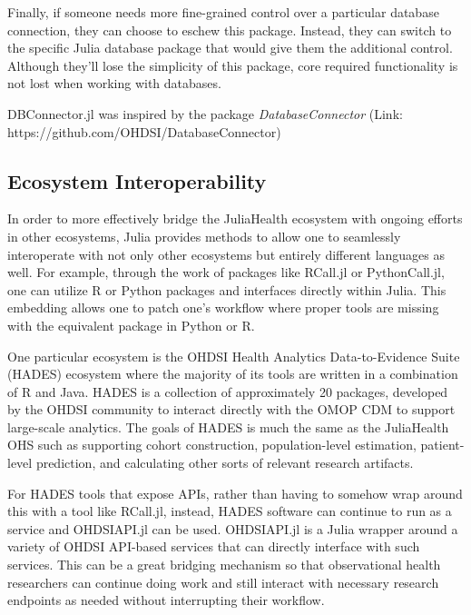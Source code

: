 \documentclass{juliacon}
\begin{document}
Finally, if someone needs more fine-grained control over a particular database connection, they can choose to eschew this package.
Instead, they can switch to the specific Julia database package that would give them the additional control.
Although they'll lose the simplicity of this package, core required functionality is not lost when working with databases.

DBConnector.jl was inspired by the package \textit{DatabaseConnector} (Link: https://github.com/OHDSI/DatabaseConnector)


\subsection{Ecosystem Interoperability}

In order to more effectively bridge the JuliaHealth ecosystem with ongoing efforts in other ecosystems, Julia provides methods to allow one to seamlessly interoperate with not only other ecosystems but entirely different languages as well.
For example, through the work of packages like RCall.jl or PythonCall.jl, one can utilize R or Python packages and interfaces directly within Julia. \cite{PythonCall.jl} \cite{RCallJl}
This embedding allows one to patch one's workflow where proper tools are missing with the equivalent package in Python or R.

One particular ecosystem is the OHDSI Health Analytics Data-to-Evidence Suite (HADES) ecosystem where the majority of its tools are written in a combination of R and Java.
HADES is a collection of approximately 20 packages, developed by the OHDSI community to interact directly with the OMOP CDM to support large-scale analytics.
The goals of HADES is much the same as the JuliaHealth OHS such as supporting cohort construction, population-level estimation, patient-level prediction, and calculating other sorts of relevant research artifacts.

For HADES tools that expose APIs, rather than having to somehow wrap around this with a tool like RCall.jl, instead, HADES software can continue to run as a service and OHDSIAPI.jl can be used.
OHDSIAPI.jl is a Julia wrapper around a variety of OHDSI API-based services that can directly interface with such services.
This can be a great bridging mechanism so that observational health researchers can continue doing work and still interact with necessary research endpoints as needed without interrupting their workflow.
\end{document}
